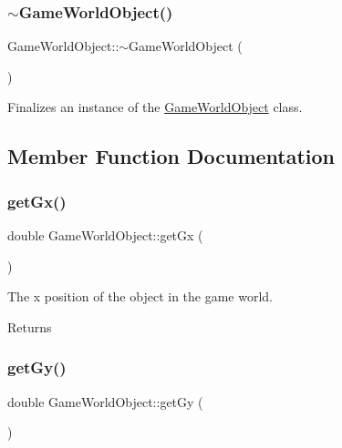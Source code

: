 \subsubsection{\texorpdfstring{$\sim$\+Game\+World\+Object()}{~GameWorldObject()}}
{\footnotesize\ttfamily Game\+World\+Object\+::$\sim$\+Game\+World\+Object (\begin{DoxyParamCaption}{ }\end{DoxyParamCaption})\hspace{0.3cm}{\ttfamily [virtual]}}



Finalizes an instance of the \hyperlink{class_game_world_object}{Game\+World\+Object} class. 



\subsection{Member Function Documentation}
\mbox{\label{class_game_world_object_a292eb95c0bb79fdceb72c35591bb1c88}} 
\subsubsection{\texorpdfstring{get\+Gx()}{getGx()}}
{\footnotesize\ttfamily double Game\+World\+Object\+::get\+Gx (\begin{DoxyParamCaption}{ }\end{DoxyParamCaption})}



The x position of the object in the game world. 

\begin{DoxyReturn}{Returns}

\end{DoxyReturn}
\mbox{\label{class_game_world_object_a2bfa46580715a74de892201b8043d2d2}} 
\subsubsection{\texorpdfstring{get\+Gy()}{getGy()}}
{\footnotesize\ttfamily double Game\+World\+Object\+::get\+Gy (\begin{DoxyParamCaption}{ }\end{DoxyParamCaption})}



